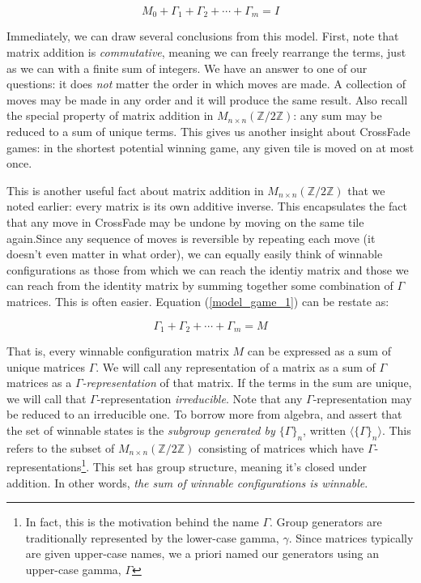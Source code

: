 \documentclass{article}[12pt]
\newcommand{\group}[1]{M_{#1 \times #1}(\mathbb{Z}/2\mathbb{Z})}
\newcommand{\subgroup}[1]{\langle\{\Gamma\}_{#1}\rangle}
\newcommand{\refx}[1]{(\ref{#1})}
\begin{document}
\begin{equation}
\label{model_game_1}
M_0 + \Gamma_1 + \Gamma_2 + \cdots + \Gamma_m = I
\end{equation}

Immediately, we can draw several conclusions from this model.  First, note that matrix addition is \emph{commutative}, meaning we can freely rearrange the terms, just as we can with a finite sum of integers.  We have an answer to one of our questions: it does \emph{not} matter the order in which moves are made.  A collection of moves may be made in any order and it will produce the same result.  Also recall the special property of matrix addition in $\group{n}$: any sum may be reduced to a sum of unique terms.  This gives us another insight about CrossFade games: in the shortest potential winning game, any given tile is moved on at most once.

This is another useful fact about matrix addition in $\group{n}$ that we noted earlier: every matrix is its own additive inverse.  This encapsulates the fact that any move in CrossFade may be undone by moving on the same tile again.Since any sequence of moves is reversible by repeating each move (it doesn't even matter in what order), we can equally easily think of winnable configurations as those from which we can reach the identiy matrix and those we can reach from the identity matrix by summing together some combination of $\Gamma$ matrices.  This is often easier.  Equation \refx{model_game_1} can be restate as:

\begin{equation}
\label{model_game_2}
\Gamma_1 + \Gamma_2 + \cdots + \Gamma_m = M
\end{equation}

That is, every winnable configuration matrix $M$ can be expressed as a sum of unique matrices $\Gamma$.  We will call any representation of a matrix as a sum of $\Gamma$ matrices as a \emph{$\Gamma$-representation} of that matrix.  If the terms in the sum are unique, we will call that $\Gamma$-representation \emph{irreducible}.  Note that any $\Gamma$-representation may be reduced to an irreducible one.  To borrow more from algebra, and assert that the set of winnable states is the \emph{subgroup generated by $\{\Gamma\}_n$}, written $\subgroup{n}$.  This refers to the subset of $\group{n}$ consisting of matrices which have $\Gamma$-representations\footnote{In fact, this is the motivation behind the name $\Gamma$.  Group generators are traditionally represented by the lower-case gamma, $\gamma$.  Since matrices typically are given upper-case names, we a priori named our generators using an upper-case gamma, $\Gamma$}.  This set has group structure, meaning it's closed under addition.  In other words, \emph{the sum of winnable configurations is winnable}.
\end{document}
